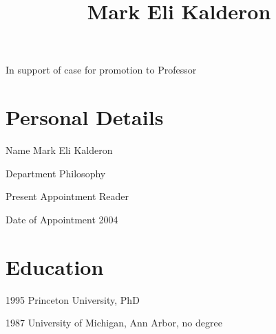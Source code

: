 \documentclass[contbibnum]{cv}
\begin{document}
% 

\title{Mark Eli Kalderon}

\maketitle

In support of case for promotion to Professor

\section{Personal Details}\label{sec:personal_details} %

\begin{topic}
	\item[Name] Mark Eli Kalderon
	\item[Department] Philosophy
	\item[Present Appointment] Reader
	\item[Date of Appointment] 2004
\end{topic}


\section{Education}\label{sec:education} %

\begin{topic}
	\item[1995] Princeton University, PhD
	\item[1987] University of Michigan, Ann Arbor, no degree
\end{topic}
\end{document}
